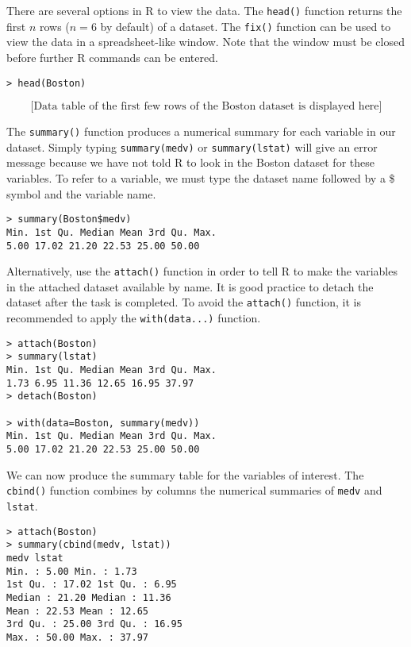 \documentclass[11pt]{article}
\begin{document}
There are several options in R to view the data. The \texttt{head()} function returns the first \( n \) rows (\( n = 6 \) by default) of a dataset. The \texttt{fix()} function can be used to view the data in a spreadsheet-like window. Note that the window must be closed before further R commands can be entered.

\begin{verbatim}
> head(Boston)
\end{verbatim}

\[ \text{[Data table of the first few rows of the Boston dataset is displayed here]} \]

The \texttt{summary()} function produces a numerical summary for each variable in our dataset. Simply typing \texttt{summary(medv)} or \texttt{summary(lstat)} will give an error message because we have not told R to look in the Boston dataset for these variables. To refer to a variable, we must type the dataset name followed by a \$ symbol and the variable name.

\begin{verbatim}
> summary(Boston$medv)
Min. 1st Qu. Median Mean 3rd Qu. Max.
5.00 17.02 21.20 22.53 25.00 50.00
\end{verbatim}

Alternatively, use the \texttt{attach()} function in order to tell R to make the variables in the attached dataset available by name. It is good practice to detach the dataset after the task is completed. To avoid the \texttt{attach()} function, it is recommended to apply the \texttt{with(data...)} function.

\begin{verbatim}
> attach(Boston)
> summary(lstat)
Min. 1st Qu. Median Mean 3rd Qu. Max.
1.73 6.95 11.36 12.65 16.95 37.97
> detach(Boston)

> with(data=Boston, summary(medv))
Min. 1st Qu. Median Mean 3rd Qu. Max.
5.00 17.02 21.20 22.53 25.00 50.00
\end{verbatim}

We can now produce the summary table for the variables of interest. The \texttt{cbind()} function combines by columns the numerical summaries of \texttt{medv} and \texttt{lstat}.

\begin{verbatim}
> attach(Boston)
> summary(cbind(medv, lstat))
medv lstat
Min. : 5.00 Min. : 1.73
1st Qu. : 17.02 1st Qu. : 6.95
Median : 21.20 Median : 11.36
Mean : 22.53 Mean : 12.65
3rd Qu. : 25.00 3rd Qu. : 16.95
Max. : 50.00 Max. : 37.97
\end{verbatim}
\end{document}
